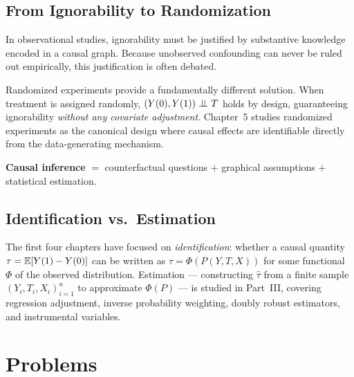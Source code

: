 \documentclass[master.tex]{subfiles}
\begin{document}
\subsection*{From Ignorability to Randomization}

In observational studies, ignorability must be justified by substantive
knowledge encoded in a causal graph.  Because unobserved confounding can
never be ruled out empirically, this justification is often debated.

Randomized experiments provide a fundamentally different solution.  When
treatment is assigned randomly, $(Y(0),Y(1)) \perp\!\!\!\perp T$ holds by design,
guaranteeing ignorability \emph{without any covariate adjustment}.  Chapter~5
studies randomized experiments as the canonical design where causal effects
are identifiable directly from the data-generating mechanism.

\bigskip
\begin{center}
  \large\textbf{Causal inference}
  $=$ counterfactual questions
  $+$ graphical assumptions
  $+$ statistical estimation.
\end{center}

\subsection*{Identification vs.\ Estimation}

The first four chapters have focused on \emph{identification}: whether a
causal quantity $\tau = \mathbb{E}[Y(1) - Y(0)]$ can be written as
$\tau = \Phi(P(Y,T,X))$ for some functional $\Phi$ of the observed
distribution.  Estimation --- constructing $\hat\tau$ from a finite sample
$(Y_i, T_i, X_i)_{i=1}^n$ to approximate $\Phi(P)$ --- is studied in
Part~III, covering regression adjustment, inverse probability weighting,
doubly robust estimators, and instrumental variables.

\newpage
{}
\section*{Problems}
\end{document}
